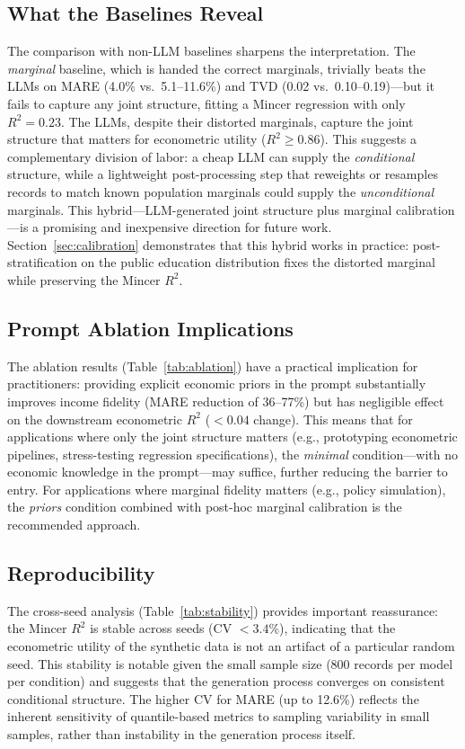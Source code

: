 \documentclass[11pt]{article}
\begin{document}
\subsection{What the Baselines Reveal}

The comparison with non-LLM baselines sharpens the interpretation.
The \emph{marginal} baseline, which is handed the correct marginals, trivially beats the LLMs on MARE (4.0\% vs.\ 5.1--11.6\%) and TVD (0.02 vs.\ 0.10--0.19)---but it fails to capture any joint structure, fitting a Mincer regression with only $R^2=0.23$.
The LLMs, despite their distorted marginals, capture the joint structure that matters for econometric utility ($R^2 \geq 0.86$).
This suggests a complementary division of labor: a cheap LLM can supply the \emph{conditional} structure, while a lightweight post-processing step that reweights or resamples records to match known population marginals could supply the \emph{unconditional} marginals.
This hybrid---LLM-generated joint structure plus marginal calibration---is a promising and inexpensive direction for future work.
Section~\ref{sec:calibration} demonstrates that this hybrid works in practice: post-stratification on the public education distribution fixes the distorted marginal while preserving the Mincer $R^2$.

\subsection{Prompt Ablation Implications}

The ablation results (Table~\ref{tab:ablation}) have a practical implication for practitioners: providing explicit economic priors in the prompt substantially improves income fidelity (MARE reduction of 36--77\%) but has negligible effect on the downstream econometric $R^2$ ($< 0.04$ change).
This means that for applications where only the joint structure matters (e.g., prototyping econometric pipelines, stress-testing regression specifications), the \emph{minimal} condition---with no economic knowledge in the prompt---may suffice, further reducing the barrier to entry.
For applications where marginal fidelity matters (e.g., policy simulation), the \emph{priors} condition combined with post-hoc marginal calibration is the recommended approach.

\subsection{Reproducibility}

The cross-seed analysis (Table~\ref{tab:stability}) provides important reassurance: the Mincer $R^2$ is stable across seeds (CV $< 3.4\%$), indicating that the econometric utility of the synthetic data is not an artifact of a particular random seed.
This stability is notable given the small sample size (800 records per model per condition) and suggests that the generation process converges on consistent conditional structure.
The higher CV for MARE (up to 12.6\%) reflects the inherent sensitivity of quantile-based metrics to sampling variability in small samples, rather than instability in the generation process itself.
\end{document}
